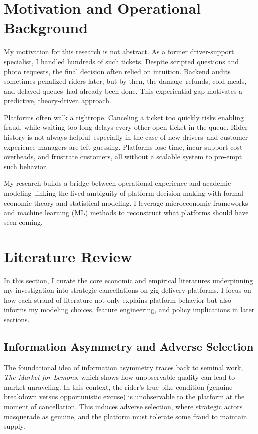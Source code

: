\documentclass[12pt,letterpaper]{article}
\begin{document}
\section{Motivation and Operational Background}

My motivation for this research is not abstract. As a former driver-support specialist, I handled hundreds of such tickets. Despite scripted questions and photo requests, the final decision often relied on intuition. Backend audits sometimes penalized riders later, but by then, the damage--refunds, cold meals, and delayed queues--had already been done. This experiential gap motivates a predictive, theory-driven approach.

Platforms often walk a tightrope. Canceling a ticket too quickly risks enabling fraud, while waiting too long delays every other open ticket in the queue. Rider history is not always helpful--especially in the case of new drivers--and customer experience managers are left guessing. Platforms lose time, incur support cost overheads, and frustrate customers, all without a scalable system to pre-empt such behavior.

My research builds a bridge between operational experience and academic modeling--linking the lived ambiguity of platform decision-making with formal economic theory and statistical modeling. I leverage microeconomic frameworks and machine learning (ML) methods to reconstruct what platforms should have seen coming.

\section{Literature Review}

In this section, I curate the core economic and empirical literatures underpinning my investigation into strategic cancellations on gig delivery platforms. I focus on how each strand of literature not only explains platform behavior but also informs my modeling choices, feature engineering, and policy implications in later sections.

\subsection{Information Asymmetry and Adverse Selection}

The foundational idea of information asymmetry traces back to \citet{akerlof1970lemons} seminal work, \textit{The Market for Lemons}, which shows how unobservable quality can lead to market unraveling. In this context, the rider's true bike condition (genuine breakdown versus opportunistic excuse) is unobservable to the platform at the moment of cancellation. This induces adverse selection, where strategic actors masquerade as genuine, and the platform must tolerate some fraud to maintain supply.
\end{document}
